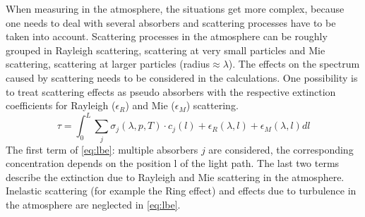 \documentclass  [
  paper    = a4,
  BCOR     = 10mm,
  twoside,
  fontsize = 12pt,
  fleqn,
  toc      = bibnumbered,
  toc      = listofnumbered,
  numbers  = noendperiod,
  headings = normal,
  listof   = leveldown,
  version  = 3.03
]                                       {scrreprt}
\begin{document}
When measuring in the atmosphere, the situations get more complex, because one needs to deal with several absorbers and scattering processes have to be taken into account. 
Scattering processes in the atmosphere can be roughly grouped in Rayleigh scattering, scattering at very small particles and Mie scattering, scattering at larger particles (radius$\approx \lambda$). The effects on the spectrum caused by scattering needs to be considered in the calculations.  One possibility is to treat scattering effects as pseudo absorbers with the respective extinction coefficients for Rayleigh ($\epsilon_R$) and  Mie ($\epsilon_M$) scattering. 
%
\begin{equation}
\tau = \int^{L}_{0}\sum_{j}\sigma_{j}\left(\lambda,p,T\right)\cdot
c_{j}\left(l\right)+\epsilon_R\left(\lambda,l\right)+\epsilon_{M}\left(\lambda,l\right)dl
\label{eq:lbe}
\end{equation}
The first term of \cref{eq:lbe}: multiple absorbers $j$ are considered, the corresponding concentration depends on the position l of the light path.
The last two terms describe the extinction due to Rayleigh and Mie scattering in the atmosphere.\\
Inelastic scattering (for example the Ring effect) and effects due to turbulence in the atmosphere are neglected in \cref{eq:lbe}. 
\end{document}
